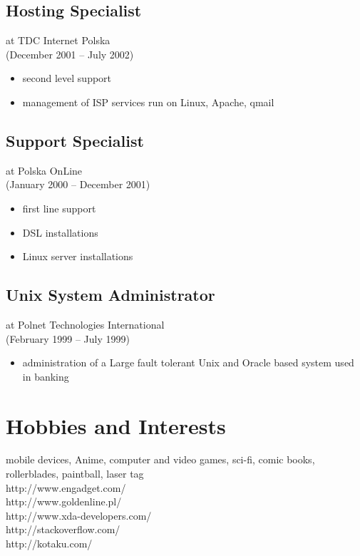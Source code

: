\documentclass[9pt,a4paper,twocolumn]{extarticle}
\begin{document}
\subsection*{Hosting Specialist }
at TDC Internet Polska \\
(December 2001 – July 2002) 
\begin{itemize}
\setlength{\itemsep}{0cm}%
\setlength{\parskip}{0cm}%
\item second level support
\item management of ISP services run on Linux, Apache, qmail
\end{itemize}

\subsection*{Support Specialist }
at Polska OnLine \\
(January 2000 – December 2001) 
\begin{itemize}
\setlength{\itemsep}{0cm}%
\setlength{\parskip}{0cm}%
\item ﬁrst line support
\item DSL installations
\item Linux server installations
\end{itemize}

\subsection*{Unix System Administrator }
at Polnet Technologies International \\
(February 1999 – July 1999) 
\begin{itemize}
\setlength{\itemsep}{0cm}%
\setlength{\parskip}{0cm}%
\item administration of a Large fault tolerant Unix and Oracle based system used in banking 
\end{itemize}

\section*{Hobbies and Interests}

mobile devices, Anime, computer and video games, sci-fi, comic books, rollerblades, paintball, laser tag\\

http://www.engadget.com/\\
http://www.goldenline.pl/\\
http://www.xda-developers.com/\\
http://stackoverflow.com/\\
http://kotaku.com/\\
\end{document}

